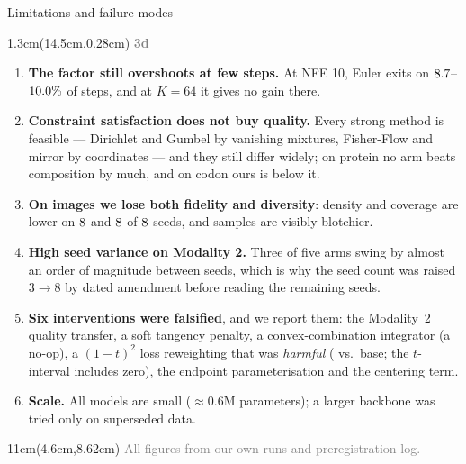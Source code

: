\documentclass[aspectratio=169,10pt]{beamer}
\newcommand{\lab}[1]{%
  \begin{textblock*}{1.3cm}(14.5cm,0.28cm)
    \raggedleft\bfseries\small\textcolor{gray}{#1}
  \end{textblock*}}
\newcommand{\srcs}[1]{%
  \begin{textblock*}{11cm}(4.6cm,8.62cm)
    \raggedleft\fontsize{4.8}{5.6}\selectfont\textcolor{gray}{#1}
  \end{textblock*}}
\begin{document}
\begin{frame}{Limitations and failure modes}
\lab{3d}
\begin{enumerate}
\item \textbf{The factor still overshoots at few steps.} At NFE 10, Euler exits on
$8.7$--$10.0\%$ of steps, and at $K{=}64$ it gives no gain there.
\item \textbf{Constraint satisfaction does not buy quality.} Every strong method is feasible ---
Dirichlet and Gumbel by vanishing mixtures, Fisher-Flow and mirror by coordinates --- and they still
differ widely; on protein no arm beats composition by much, and on codon ours is below it.
\item \textbf{On images we lose both fidelity and diversity}: density and coverage are lower on
$8$ and $8$ of $8$ seeds, and samples are visibly blotchier.
\item \textbf{High seed variance on Modality 2.} Three of five arms swing by almost an order of
magnitude between seeds, which is why the seed count was raised $3 \rightarrow 8$ by dated
amendment before reading the remaining seeds.
\item \textbf{Six interventions were falsified}, and we report them: the Modality~2 quality transfer, a soft tangency penalty,
a convex-combination integrator (a no-op), a $(1-t)^2$ loss reweighting that was
\emph{harmful} (\ReweightCIProt{} vs.\ base; the $t$-interval includes zero), the endpoint
parameterisation and the centering term.
\item \textbf{Scale.} All models are small ($\approx$0.6M parameters); a larger backbone was tried
only on superseded data.
\end{enumerate}
\srcs{All figures from our own runs and preregistration log.}
\end{frame}
\end{document}
